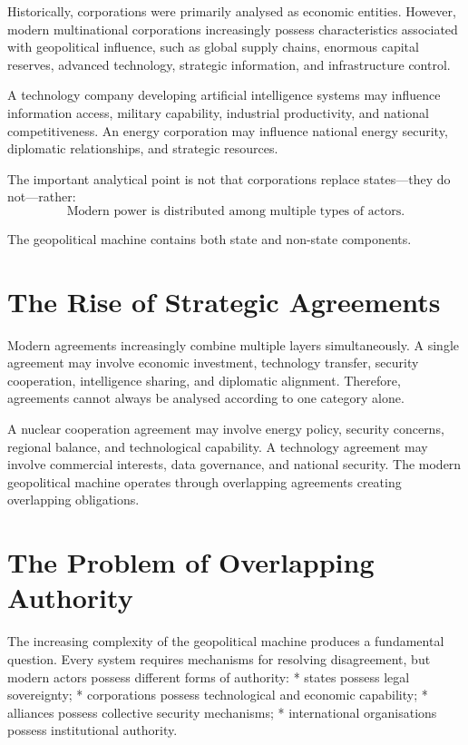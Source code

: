 \documentclass[11pt,openany]{book}
\theoremstyle{plain}
\theoremstyle{definition}
\begin{document}
Historically, corporations were primarily analysed as economic entities. However, modern multinational corporations increasingly possess characteristics associated with geopolitical influence, such as global supply chains, enormous capital reserves, advanced technology, strategic information, and infrastructure control.

A technology company developing artificial intelligence systems may influence information access, military capability, industrial productivity, and national competitiveness. An energy corporation may influence national energy security, diplomatic relationships, and strategic resources. 

The important analytical point is not that corporations replace states—they do not—rather:
\[
\boxed{
\text{Modern power is distributed among multiple types of actors.}
}
\]

The geopolitical machine contains both state and non-state components.


\section*{The Rise of Strategic Agreements}

Modern agreements increasingly combine multiple layers simultaneously. A single agreement may involve economic investment, technology transfer, security cooperation, intelligence sharing, and diplomatic alignment. Therefore, agreements cannot always be analysed according to one category alone.

A nuclear cooperation agreement may involve energy policy, security concerns, regional balance, and technological capability. A technology agreement may involve commercial interests, data governance, and national security. The modern geopolitical machine operates through overlapping agreements creating overlapping obligations.


\section*{The Problem of Overlapping Authority}

The increasing complexity of the geopolitical machine produces a fundamental question. Every system requires mechanisms for resolving disagreement, but modern actors possess different forms of authority:
* states possess legal sovereignty;
* corporations possess technological and economic capability;
* alliances possess collective security mechanisms;
* international organisations possess institutional authority.
\end{document}
